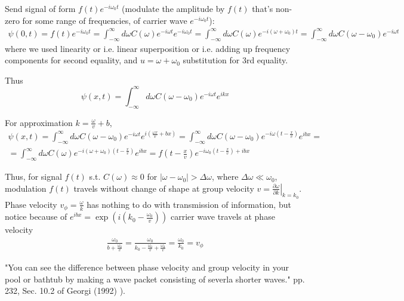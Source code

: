 \documentclass[10pt]{amsart}
\begin{document}
\begin{multicols*}{2}
Send signal of form $f(t) e^{-i\omega_0 t}$ (modulate the amplitude by $f(t)$ that's non-zero for some range of frequencies, of carrier wave $e^{-i \omega_0 t}$):
\[
\begin{gathered}
	\psi(0,t) = f(t) e^{-i \omega_0 t} = \int_{-\infty}^{\infty} d\omega C(\omega) e^{-i\omega t} e^{-i\omega_0 t} = \int_{-\infty}^{\infty} d\omega C(\omega) e^{-i(\omega + \omega_0)t} = \int_{-\infty}^{\infty} d\omega C(\omega - \omega_0) e^{-i\omega t}
\end{gathered}
\]
where we used linearity or i.e. linear superposition or i.e. adding up frequency components for second equality, and $u= \omega + \omega_0$ substitution for 3rd equality.

Thus
\[
\psi(x,t) = \int_{-\infty}^{\infty} d\omega C(\omega - \omega_0) e^{-i\omega t} e^{ikx}
\]

For approximation $k = \frac{\omega }{v} + b$, 
\[
\begin{gathered}
\psi(x,t) = \int_{-\infty}^{\infty} d\omega C(\omega - \omega_0) e^{-i\omega t} e^{ i \left( \frac{\omega x}{v} + bx \right) } = \int_{-\infty}^{\infty} d\omega C(\omega - \omega_0) e^{ -i \omega \left( t - \frac{x}{v} \right) } e^{ibx } = \\
= \int_{-\infty}^{\infty} d\omega C(\omega) e^{-i (\omega + \omega_0) \left( t - \frac{x}{v} \right) } e^{ibx} = f(t - \frac{x}{v})	 e^{-i \omega_0 (t - \frac{x}{v} ) + ibx}
\end{gathered}
\]

Thus, for signal $f(t)$ s.t. $C(\omega) \approx 0$ for $| \omega - \omega_0| > \Delta \omega$, where $\Delta \omega \ll \omega_0$, \\
modulation $f(t)$ travels without change of shape at group velocity $v = \left. \frac{ \partial \omega}{ \partial k } \right|_{k=k_0}$. \\
Phase velocity $v_{\phi} = \frac{\omega}{k}$ has nothing to do with transmission of information, but notice because of $e^{ibx} = \exp{ \left( i \left( k_0 - \frac{ \omega_0}{v} \right) \right) }$ carrier wave travels at phase velocity
\[
\begin{gathered}
	\frac{ \omega_0 }{ b + \frac{\omega_0}{v} } = \frac{ \omega_0}{ k_0 - \frac{\omega_0}{v} + \frac{\omega_0}{v} } = \frac{\omega_0}{k_0} = v_{\phi}
\end{gathered}
\]

"You can see the difference between phase velocity and group velocity in your pool or bathtub by making a wave packet consisting of severla shorter waves." pp. 232, Sec. 10.2 of Georgi (1992) \cite{Geor1992}).


\end{multicols*}
\end{document}
